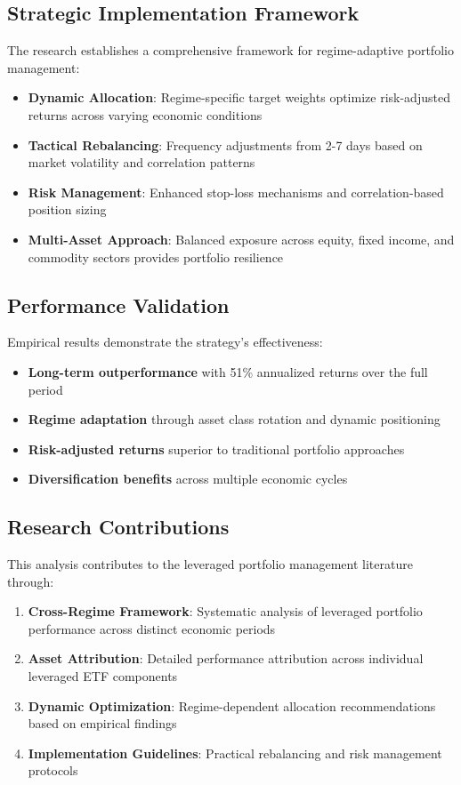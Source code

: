 \documentclass[onecolumn,11pt]{IEEEtran}
\begin{document}
\subsection{Strategic Implementation Framework}

The research establishes a comprehensive framework for regime-adaptive portfolio management:

\begin{itemize}
    \item \textbf{Dynamic Allocation}: Regime-specific target weights optimize risk-adjusted returns across varying economic conditions
    \item \textbf{Tactical Rebalancing}: Frequency adjustments from 2-7 days based on market volatility and correlation patterns
    \item \textbf{Risk Management}: Enhanced stop-loss mechanisms and correlation-based position sizing
    \item \textbf{Multi-Asset Approach}: Balanced exposure across equity, fixed income, and commodity sectors provides portfolio resilience
\end{itemize}

\subsection{Performance Validation}

Empirical results demonstrate the strategy's effectiveness:
\begin{itemize}
    \item \textbf{Long-term outperformance} with 51\% annualized returns over the full period
    \item \textbf{Regime adaptation} through asset class rotation and dynamic positioning
    \item \textbf{Risk-adjusted returns} superior to traditional portfolio approaches
    \item \textbf{Diversification benefits} across multiple economic cycles
\end{itemize}

\subsection{Research Contributions}

This analysis contributes to the leveraged portfolio management literature through:
\begin{enumerate}
    \item \textbf{Cross-Regime Framework}: Systematic analysis of leveraged portfolio performance across distinct economic periods
    \item \textbf{Asset Attribution}: Detailed performance attribution across individual leveraged ETF components
    \item \textbf{Dynamic Optimization}: Regime-dependent allocation recommendations based on empirical findings
    \item \textbf{Implementation Guidelines}: Practical rebalancing and risk management protocols
\end{enumerate}
\end{document}

